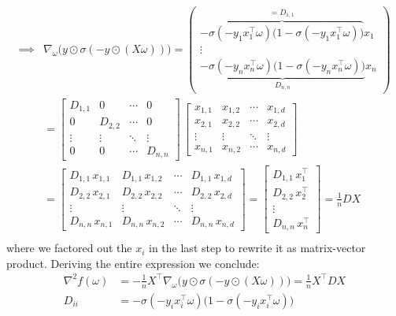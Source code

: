 \documentclass{article}
\begin{document}
%
\begin{align*}
\implies &\nabla_\omega \big(y \odot \sigma(-y \odot (X\omega))\big) = 
\begin{pmatrix}
 \overbrace{- \sigma(-y_1 x_1^\top \omega) \big(1 - \sigma(-y_1 x_1^\top \omega)\big)}^{=D_{1,1}} x_1 \\
 \vdots \\
 \underbrace{ - \sigma(-y_n x_n^\top \omega) \big(1 - \sigma(-y_n x_n^\top \omega)\big)}_{D_{n,n}} x_n
\end{pmatrix}\\
&=
\begin{bmatrix}
D_{1,1} & 0       & \cdots & 0       \\
0       & D_{2,2} & \cdots & 0       \\
\vdots  & \vdots  & \ddots & \vdots  \\
0       & 0       & \cdots & D_{n,n}
\end{bmatrix}
\,
\begin{bmatrix}
x_{1,1} & x_{1,2} & \cdots & x_{1,d} \\
x_{2,1} & x_{2,2} & \cdots & x_{2,d} \\
\vdots  & \vdots  & \ddots & \vdots  \\
x_{n,1} & x_{n,2} & \cdots & x_{n,d}
\end{bmatrix} \\
&=
\begin{bmatrix}
D_{1,1}\,x_{1,1} & D_{1,1}\,x_{1,2} & \cdots & D_{1,1}\,x_{1,d} \\
D_{2,2}\,x_{2,1} & D_{2,2}\,x_{2,2} & \cdots & D_{2,2}\,x_{2,d} \\
\vdots           & \vdots           & \ddots & \vdots           \\
D_{n,n}\,x_{n,1} & D_{n,n}\,x_{n,2} & \cdots & D_{n,n}\,x_{n,d}
\end{bmatrix}
=
\begin{bmatrix}
D_{1,1}\,x_1^\top \\
D_{2,2}\,x_2^\top \\
\vdots           \\
D_{n,n}\,x_n^\top
\end{bmatrix}
= \frac{1}{n} D X\\
\end{align*}
where we factored out the $x_i$ in the last step to rewrite it as matrix-vector product. Deriving the entire expression we conclude:
\begin{align*}
\nabla ^2 f(\omega) &= -\frac{1}{n} X^\top \nabla_\omega \big(y \odot \sigma(-y \odot (X\omega))\big) = \frac{1}{n} X^\top D X \\
D_{ii} &= -\sigma(-y_i x_i^\top \omega)\big(1 - \sigma(-y_i x_i^\top \omega)\big) \quad
\end{align*}
\end{document}
